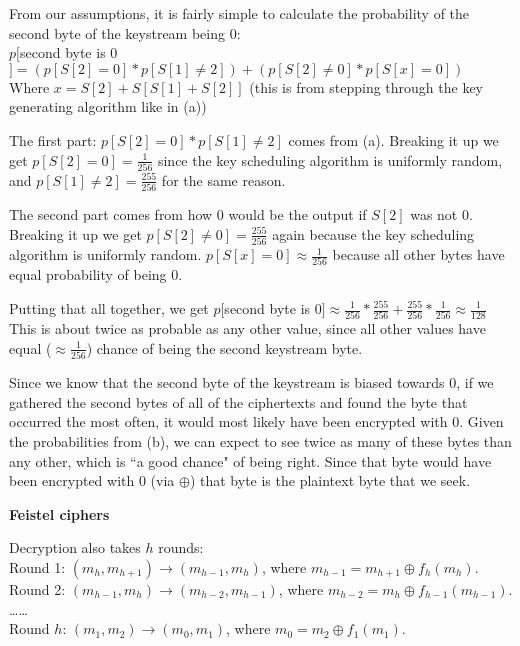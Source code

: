 \documentclass[12pt]{article}
\begin{document}
\begin{list}{.}{}
\begin{list}{()}{}
From our assumptions, it is fairly simple to calculate the probability of the
second byte of the keystream being 0:\\
$p[$second byte is 0$] = (p[S[2] = 0] * p[S[1] \neq 2]) + (p[S[2] \neq 0] *
p[S[x] = 0])$\\
Where $x = S[2] + S[S[1]+S[2]]$ (this is from stepping through the key
generating algorithm like in (a))

The first part: $p[S[2] = 0] * p[S[1] \neq 2]$ comes from (a).  Breaking it up
we get $p[S[2] = 0] = \frac{1}{256}$ since the key scheduling algorithm is
uniformly random, and $p[S[1] \neq 2] = \frac{255}{256}$ for the same reason.

The second part comes from how 0 would be the output if $S[2]$ was not 0.
Breaking it up we get $p[S[2] \neq 0] = \frac{255}{256}$ again because the key
scheduling algorithm is uniformly random.  $p[S[x] = 0] \approx \frac{1}{256}$
because all other bytes have equal probability of being 0.

Putting that all together, we get $p[$second byte is 0$] \approx
\frac{1}{256} * \frac{255}{256} + \frac{255}{256} * \frac{1}{256} \approx
\frac{1}{128}$\\
This is about twice as probable as any other value, since all other values have
equal ($\approx \frac{1}{256}$) chance of being the second keystream byte.

\item Since we know that the second byte of the keystream is biased towards 0,
if we gathered the second bytes of all of the ciphertexts and found the byte
that occurred the most often, it would most likely have been encrypted with 0.
Given the probabilities from (b), we can expect to see twice as many of these
bytes than any other, which is ``a good chance" of being right.  Since that byte
would have been encrypted with 0 (via $\oplus$) that byte is the plaintext byte
that we seek.
\end{list}

\item \textbf{Feistel ciphers}
\begin{list}{()}{}
\item Decryption also takes $h$ rounds:\\
Round 1: $(m_h, m_{h+1}) \rightarrow (m_{h-1}, m_h)$, where $m_{h-1} =
m_{h+1} \oplus f_h(m_h)$.\\
Round 2: $(m_{h-1}, m_h) \rightarrow (m_{h-2}, m_{h-1})$, where $m_{h-2} =
m_h \oplus f_{h-1}(m_{h-1})$.\\
\dots \dots \\
Round $h$: $(m_1, m_2) \rightarrow (m_0, m_1)$, where $m_0 =
m_2 \oplus f_1(m_1)$.


\end{list}
\end{list}
\end{document}
